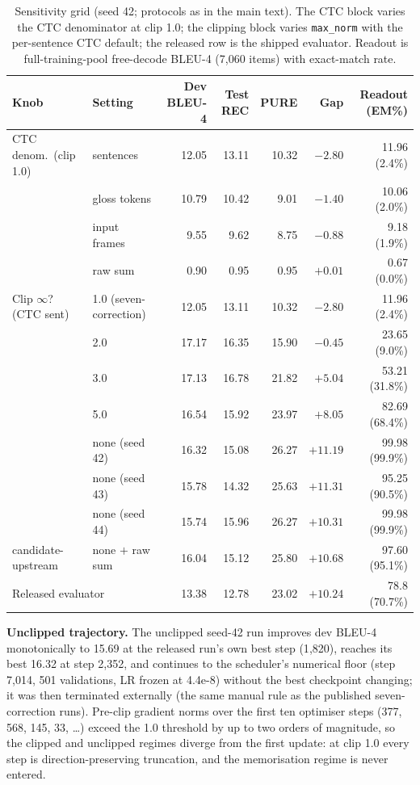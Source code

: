 \documentclass[pdflatex,sn-chicago]{sn-jnl}
\begin{document}
\begin{table}[h]
\centering
\small
\caption{Sensitivity grid (seed 42; protocols as in the main text). The CTC block varies the CTC denominator at clip 1.0; the clipping block varies \texttt{max\_norm} with the per-sentence CTC default; the released row is the shipped evaluator. Readout is full-training-pool free-decode BLEU-4 (7{,}060 items) with exact-match rate.}
\label{tab:clip_grid_full}
\begin{tabular}{llrrrrr}
\toprule
Knob & Setting & Dev BLEU-4 & Test REC & PURE & Gap & Readout (EM\%) \\
\midrule
CTC denom.\ (clip 1.0) & sentences & 12.05 & 13.11 & 10.32 & $-2.80$ & 11.96 (2.4\%) \\
 & gloss tokens & 10.79 & 10.42 & 9.01 & $-1.40$ & 10.06 (2.0\%) \\
 & input frames & 9.55 & 9.62 & 8.75 & $-0.88$ & 9.18 (1.9\%) \\
 & raw sum & 0.90 & 0.95 & 0.95 & $+0.01$ & 0.67 (0.0\%) \\
\midrule
Clip $\infty$? (CTC sent) & 1.0 (seven-correction) & 12.05 & 13.11 & 10.32 & $-2.80$ & 11.96 (2.4\%) \\
 & 2.0 & 17.17 & 16.35 & 15.90 & $-0.45$ & 23.65 (9.0\%) \\
 & 3.0 & 17.13 & 16.78 & 21.82 & $+5.04$ & 53.21 (31.8\%) \\
 & 5.0 & 16.54 & 15.92 & 23.97 & $+8.05$ & 82.69 (68.4\%) \\
 & none (seed 42) & 16.32 & 15.08 & 26.27 & $+11.19$ & 99.98 (99.9\%) \\
 & none (seed 43) & 15.78 & 14.32 & 25.63 & $+11.31$ & 95.25 (90.5\%) \\
 & none (seed 44) & 15.74 & 15.96 & 26.27 & $+10.31$ & 99.98 (99.9\%) \\
\midrule
candidate-upstream & none $+$ raw sum & 16.04 & 15.12 & 25.80 & $+10.68$ & 97.60 (95.1\%) \\
\midrule
\multicolumn{2}{l}{Released evaluator} & 13.38 & 12.78 & 23.02 & $+10.24$ & 78.8 (70.7\%) \\
\bottomrule
\end{tabular}
\end{table}

\textbf{Unclipped trajectory.} The unclipped seed-42 run improves dev BLEU-4 monotonically to 15.69 at the released run's own best step (1{,}820), reaches its best 16.32 at step 2{,}352, and continues to the scheduler's numerical floor (step 7{,}014, 501 validations, LR frozen at 4.4e-8) without the best checkpoint changing; it was then terminated externally (the same manual rule as the published seven-correction runs). Pre-clip gradient norms over the first ten optimiser steps (377, 568, 145, 33, \ldots) exceed the 1.0 threshold by up to two orders of magnitude, so the clipped and unclipped regimes diverge from the first update: at clip 1.0 every step is direction-preserving truncation, and the memorisation regime is never entered.
\end{document}
